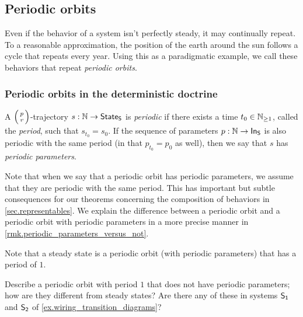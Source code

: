 \documentclass[DynamicalBook]{subfiles}
\begin{document}
\subsection{Periodic orbits}\label{sec.periodic_orbit_discrete}

Even if the behavior of a system isn't perfectly steady, it may continually
repeat. To a reasonable approximation, the position of the earth around the sun
follows a cycle that repeats every year. Using this as a paradigmatic example,
we call these behaviors that repeat \emph{periodic orbits}.

\subsubsection{Periodic orbits in the deterministic doctrine}

\begin{definition} \label{def.periodic_orbit_discrete}
  A $\lens{p}{v}$-trajectory $s : \mathbb{N} \to \mathsf{State}_{\mathsf{S}}$ is \emph{periodic} if there
  exists a time $t_0 \in \mathbb{N}_{\geq1}$, called the \emph{period}, such that $s_{t_0} = s_0$. If the sequence of
  parameters $p : \mathbb{N} \to \mathsf{In}_{\mathsf{S}}$ is also periodic with the same period (in that $p_{t_0} = p_0$ as well), then we say that $s$ has \emph{periodic parameters}.
  

\end{definition}

\begin{remark}
  Note that when we say that a periodic orbit has periodic parameters, we assume
  that they are periodic with the same period. This has important but subtle
  consequences for our theorems concerning the composition of behaviors in
  \cref{sec.representables}. We explain the difference between a periodic orbit
  and a periodic orbit with periodic parameters in a more precise manner
  in \cref{rmk.periodic_parameters_versus_not}.
\end{remark}

\begin{remark}
  Note that a steady state is a periodic orbit (with periodic parameters) that has
  a period of $1$. 
\end{remark}

\begin{exercise}
Describe a periodic orbit with period $1$ that does not have periodic
parameters; how are they different from steady states? Are there any of these in systems $\mathsf{S_1}$ and $\mathsf{S_2}$ of \cref{ex.wiring_transition_diagrams}?
\end{exercise}
\end{document}
